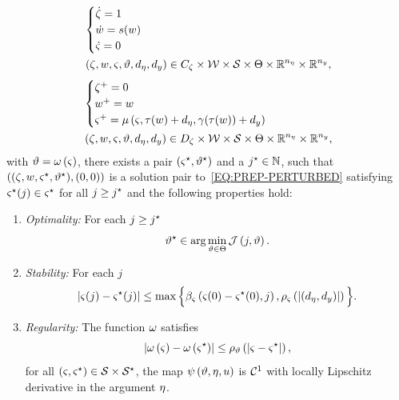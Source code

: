 \begin{equation}%
	\label{EQ:PREP-PERTURBED}
	\begin{split}
		&
		\begin{cases}
			\dot{\clock} = 1 \\
			\dot{\ww} = \wfun(\ww) \\
			\dot{\id} = 0
		\end{cases} \\
		& \lp \clock, \ww, \id, \param, d_{\im}, d_{\yy} \rp \in C_{\clock} \times \wset \times \idset \times \paramset \times \R^{\dd{\im}} \times \R^{\dd{\yy}}, \\
	\end{split}
\end{equation}
\begin{equation*}
	\begin{split}
		&
		\begin{cases}
			\zeta^{+} = 0 \\
			w^{+} = w \\
			\varsigma^{+} = \mu \left( \varsigma, \tau(w) + d_{\eta}, \gamma(\tau(w)) + d_{y} \right)
		\end{cases} \\
		& \left( \zeta, w, \varsigma, \vartheta, d_{\eta}, d_{y} \right) \in D_{\zeta} \times \mathcal{W} \times \mathcal{S} \times \Theta \times \mathbb{R}^{n_{\eta}} \times \mathbb{R}^{n_{y}}, \\
	\end{split}
\end{equation*}
with $\vartheta = \omega \left( \varsigma \right)$, there exists a pair $(\varsigma^{\star}, \vartheta^{\star})$ and a $j^{\star} \in \mathbb{N}$, such that $((\zeta, w, \varsigma^{\star}, \vartheta^{\star}),(0,0))$ is a solution pair to~\eqref{EQ:PREP-PERTURBED}
satisfying $\varsigma^{\star}(j) \in \varsigma^{\star}$ for all $j \ge j^{\star}$ and the following properties hold:
\begin{enumerate}
   \item \emph{Optimality:}
   For each $j \ge j^{\star}$
   \begin{equation*}
      \vartheta^{\star} \in \arg\min_{\vartheta \in \Theta} \mathcal{J} \left( j, \vartheta \right).
   \end{equation*}
   \item \emph{Stability:}
   For each $j$
   \begin{equation*}
      \left| \varsigma(j) - \varsigma^{\star}(j) \right| \le \max \Big\{ \beta_{\varsigma}\left( \varsigma(0) - \varsigma^{\star}(0), j \right), \rho_{\varsigma}\left( \left| \left( d_{\eta}, d_{y} \right) \right| \right) \Big\}.
   \end{equation*}
   \item \emph{Regularity:}
   The function $\omega$ satisfies 
   \begin{equation*}
      \left| \omega\left( \varsigma \right) - \omega\left( \varsigma^{\star} \right) \right| \le \rho_{\vartheta} \left( \left| \varsigma - \varsigma^{\star} \right| \right),
   \end{equation*}
   for all $\left( \varsigma, \varsigma^{\star} \right) \in \mathcal{S} \times \mathcal{S}^{\star}$, the map $\psi \left( \vartheta, \eta, u \right)$ is $\mathcal{C}^1$ with locally Lipschitz derivative in the argument $\eta$.
\end{enumerate}
